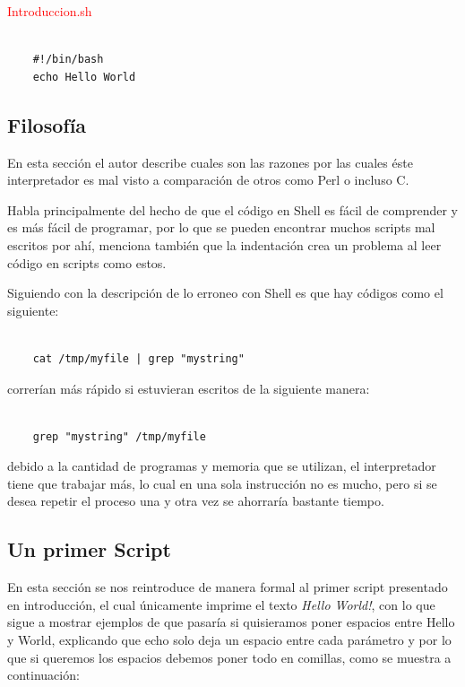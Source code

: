 \documentclass{article}
\begin{document}
\textcolor{red}{Introduccion.sh}
\begin{framed}
\begin{verbatim}
	
    #!/bin/bash
    echo Hello World
\end{verbatim}
\end{framed}

\subsection{Filosofía}

En esta sección el autor describe cuales son las razones por las cuales éste interpretador es mal visto a comparación de otros como Perl o incluso C.

Habla principalmente del hecho de que el código en Shell es fácil de comprender y es más fácil de programar, por lo que se pueden encontrar muchos scripts mal escritos por ahí, menciona también que la indentación crea un problema al leer código en scripts como estos.

Siguiendo con la descripción de lo erroneo con Shell es que hay códigos como el siguiente:
\begin{verbatim}
	
    cat /tmp/myfile | grep "mystring"
\end{verbatim}
correrían más rápido si estuvieran escritos de la siguiente manera:
\begin{verbatim}
	
    grep "mystring" /tmp/myfile
\end{verbatim}
debido a la cantidad de programas y memoria que se utilizan, el interpretador tiene que trabajar más, lo cual en una sola instrucción no es mucho, pero si se desea repetir el proceso una y otra vez se ahorraría bastante tiempo.

\subsection{Un primer Script}

En esta sección se nos reintroduce de manera formal al primer script presentado en introducción, el cual únicamente imprime el texto \textit{Hello World!}, con lo que sigue a mostrar ejemplos de que pasaría si quisieramos poner espacios entre Hello y World, explicando que echo solo deja un espacio entre cada parámetro y por lo que si queremos los espacios debemos poner todo en comillas, como se muestra a continuación:~\\
\end{document}
